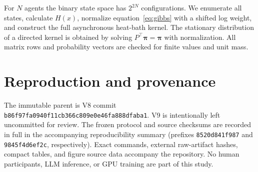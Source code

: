 \documentclass[12pt]{article}
\begin{document}
For $N$ agents the binary state space has $2^{2N}$ configurations. We enumerate
all states, calculate $H(x)$, normalize equation~\eqref{eq:gibbs} with a shifted
log weight, and construct the full asynchronous heat-bath kernel. The stationary
distribution of a directed kernel is obtained by solving
$P^\top\bm\pi=\bm\pi$ with normalization. All matrix rows and probability
vectors are checked for finite values and unit mass.

\section{Reproduction and provenance}

The immutable parent is V8 commit
\texttt{b86f97fa0940f11cb366c809e0e46fa888dfaba1}. V9 is intentionally left
uncommitted for review. The frozen protocol and source checksums are
recorded in full in the accompanying reproducibility summary (prefixes
\texttt{8520d841f987} and \texttt{9845f4d6ef2c}, respectively). Exact commands,
external raw-artifact hashes, compact tables, and figure source data accompany
the repository.
No human participants, LLM inference, or GPU training are part of this study.



\end{document}
